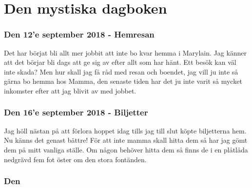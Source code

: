 
\part{Den mystiska dagboken}
\section{Den 12'e september 2018 - Hemresan}
Det har börjat bli allt mer jobbit att inte bo kvar hemma i Marylain. Jag känner att det börjar bli dags att ge sig av efter allt som har hänt. Ett besök kan väl inte skada? Men hur skall jag få råd med resan och boendet, jag vill ju inte så gärna bo hemma hos Mamma, den senaste tiden har det ju inte varit så mycket inkomster efter att jag blivit av med jobbet.
\section{Den 16'e september 2018 - Biljetter}
Jag höll nästan på att förlora hoppet idag tills jag till slut köpte biljetterna hem. Nu känns det genast bättre! För att inte mamma skall hitta dem så har jag gömt dem på mitt vanliga ställe. Om någon behöver hitta dem så finns de i en plåtlåda nedgrävd fem fot öster om den stora fontänden.
\section{Den }
